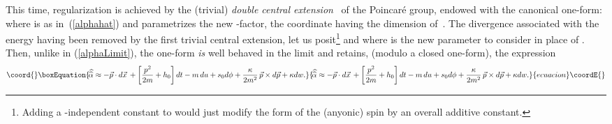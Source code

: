 \documentclass[a4paper,11pt]{article}
\providecommand{\bR}{{\bf R}}
\providecommand{\vx}{{\vec x}}
\def\vp{{\vec p}}
\def\vx{{\vec x}}
\begin{document}
This time, regularization
is achieved by the (trivial) {\it double central extension}\
\myHighlight{$\widehat{\!\widehat{G}}=\widehat{G}\times\bR$}\coordHE{}
of the Poincar\'e group, endowed with the canonical one-form:
\coordHE{}
where \myHighlight{$\widehat{\alpha}$}\coordHE{} is as in~(\ref{alphahat}) and \myHighlight{$\theta$}\coordHE{} parametrizes
the new \myHighlight{$(\bR,+)$}\coordHE{}-factor, the coordinate \myHighlight{$\chi$}\coordHE{} having the dimension
of~\myHighlight{$\hbar$}\coordHE{}.
  The divergence associated with the energy having been removed by the first
trivial central extension, let us posit\footnote{Adding a
\coordHE{}-independent constant to
\myHighlight{$\chi$}\coordHE{} would just modify the form of the (anyonic) spin \coordHE{} by an overall
additive constant.}
\coordHE{}
and
\coordHE{}
where \myHighlight{$w\in\bR$}\coordHE{} is the new parameter to consider in place of \myHighlight{$\theta$}\coordHE{}.
Then, unlike \myHighlight{$\alpha$}\coordHE{} in (\ref{alphaLimit}), the one-form
\myHighlight{$\widehat{\!\widehat{\alpha}}$}\coordHE{}
{\it is} well behaved
in the limit \coordHE{} and retains, (modulo a closed one-form),
the expression
\begin{equation}\coord{}\boxEquation{
\widehat{\!\widehat{\alpha}}
\approx
-\vp\cdot d\vx\,
+\left[
\frac{p^2}{2m}+h_0
\right]dt
-m\,du
+s_0d\phi
+
\frac{\kappa}{2m^2}\,\vp\times{}d\vp
+\kappa{}dw.
\label{alphaLimitOK}
}{
\widehat{\!\widehat{\alpha}}
\approx
-\vp\cdot d\vx\,
+\left[
\frac{p^2}{2m}+h_0
\right]dt
-m\,du
+s_0d\phi
+
\frac{\kappa}{2m^2}\,\vp\times{}d\vp
+\kappa{}dw.
}{ecuacion}\coordE{}\end{equation}


\end{document}
